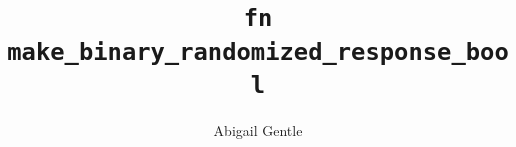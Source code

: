 \documentclass{article}
\title{\texttt{fn make\_binary\_randomized\_response\_bool}}
\author{Abigail Gentle}
\begin{document}
\maketitle

\contrib
\end{document}
